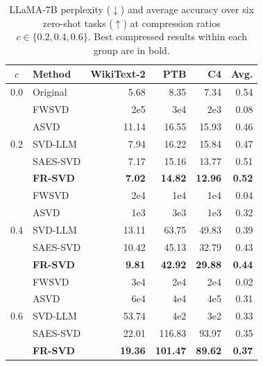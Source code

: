 \begin{table}[t]
\centering
\small
\setlength{\tabcolsep}{11pt}
\renewcommand{\arraystretch}{1.05}
\caption{LLaMA-7B perplexity ($\downarrow$) and average accuracy over six zero-shot tasks ($\uparrow$) at compression ratios $c\in\{0.2,0.4,0.6\}$. Best compressed results within each group are in bold.}
\label{tab:main-results}
\begin{tabular}{clrrrr}
\toprule
$c$ & Method & WikiText-2 & PTB & C4 & Avg. \\
\midrule
0.0 & Original & 5.68 & 8.35 & 7.34 & 0.54 \\
\midrule
\multirow{5}{*}{0.2}
 & FWSVD & 2e5 & 3e4 & 2e3 & 0.08 \\
 & ASVD & 11.14 & 16.55 & 15.93 & 0.46 \\
 & SVD-LLM & 7.94 & 16.22 & 15.84 & 0.47 \\
 & SAES-SVD & 7.17 & 15.16 & 13.77 & 0.51 \\
\rowcolor{gray!12}
 & \textbf{FR-SVD} & \textbf{7.02} & \textbf{14.82} & \textbf{12.96} & \textbf{0.52} \\
\midrule
\multirow{5}{*}{0.4}
 & FWSVD & 2e4 & 1e4 & 1e4 & 0.04 \\
 & ASVD & 1e3 & 3e3 & 1e3 & 0.32 \\
 & SVD-LLM & 13.11 & 63.75 & 49.83 & 0.39 \\
 & SAES-SVD & 10.42 & 45.13 & 32.79 & 0.43 \\
\rowcolor{gray!12}
 & \textbf{FR-SVD} & \textbf{9.81} & \textbf{42.92} & \textbf{29.88} & \textbf{0.44} \\
\midrule
\multirow{5}{*}{0.6}
 & FWSVD & 3e4 & 2e4 & 2e4 & 0.02 \\
 & ASVD & 6e4 & 4e4 & 4e5 & 0.31 \\
 & SVD-LLM & 53.74 & 4e2 & 3e2 & 0.33 \\
 & SAES-SVD & 22.01 & 116.83 & 93.97 & 0.35 \\
\rowcolor{gray!12}
 & \textbf{FR-SVD} & \textbf{19.36} & \textbf{101.47} & \textbf{89.62} & \textbf{0.37} \\
\bottomrule
\end{tabular}
\end{table}
